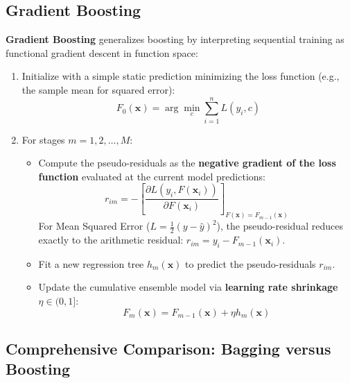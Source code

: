 \subsection{Gradient Boosting}
\textbf{Gradient Boosting} generalizes boosting by interpreting sequential training as functional gradient descent in function space:
\begin{enumerate}
    \item Initialize with a simple static prediction minimizing the loss function (e.g., the sample mean for squared error):
    \begin{equation}
        F_0(\mathbf{x}) = \arg\min_c \sum_{i=1}^n L(y_i, c)
    \end{equation}
    \item For stages $m = 1, 2, \dots, M$:
    \begin{itemize}
        \item Compute the pseudo-residuals as the \textbf{negative gradient of the loss function} evaluated at the current model predictions:
        \begin{equation}
            r_{im} = -\left[ \frac{\partial L(y_i, F(\mathbf{x}_i))}{\partial F(\mathbf{x}_i)} \right]_{F(\mathbf{x}) = F_{m-1}(\mathbf{x})}
        \end{equation}
        For Mean Squared Error ($L = \frac{1}{2}(y - \hat{y})^2$), the pseudo-residual reduces exactly to the arithmetic residual: $r_{im} = y_i - F_{m-1}(\mathbf{x}_i)$.
        \item Fit a new regression tree $h_m(\mathbf{x})$ to predict the pseudo-residuals $r_{im}$.
        \item Update the cumulative ensemble model via \textbf{learning rate shrinkage} $\eta \in (0, 1]$:
        \begin{equation}
            F_m(\mathbf{x}) = F_{m-1}(\mathbf{x}) + \eta h_m(\mathbf{x})
        \end{equation}
    \end{itemize}
\end{enumerate}

\subsection{Comprehensive Comparison: Bagging versus Boosting}

